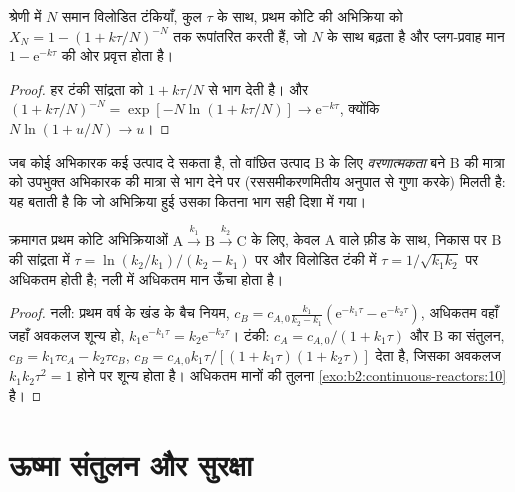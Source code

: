 \begin{proposition}[श्रेणी में टंकियाँ]\label{prop:b2:continuous-reactors:cascade}
श्रेणी में $N$ समान विलोडित टंकियाँ, कुल  $\tau$ के साथ,
प्रथम कोटि की अभिक्रिया को $X_N = 1 - (1 + k\tau/N)^{-N}$ तक रूपांतरित करती हैं, जो
$N$ के साथ बढ़ता है और प्लग-प्रवाह मान $1 - \mathrm e^{-k\tau}$ की ओर प्रवृत्त होता है।
\end{proposition}

\begin{proof}
हर टंकी सांद्रता को $1 + k\tau/N$ से भाग देती है। और $(1 +
k\tau/N)^{-N} = \exp[-N\ln(1 + k\tau/N)] \to \mathrm e^{-k\tau}$, क्योंकि
$N\ln(1 + u/N) \to u$।
\end{proof}

\begin{definition}\label{def:b2:continuous-reactors:selectivity}
जब कोई अभिकारक कई उत्पाद दे सकता है, तो वांछित उत्पाद B के लिए
\emph{वरणात्मकता} बने B की मात्रा को उपभुक्त
अभिकारक की मात्रा से भाग देने पर (रससमीकरणमितीय अनुपात से गुणा करके) मिलती है: यह बताती है कि
जो अभिक्रिया हुई उसका कितना भाग सही दिशा में गया।
\end{definition}

\begin{proposition}[टंकी और नली में एक मध्यवर्ती]\label{prop:b2:continuous-reactors:consecutive}
क्रमागत प्रथम कोटि अभिक्रियाओं $\mathrm A \xrightarrow{k_1} \mathrm B
\xrightarrow{k_2} \mathrm C$ के लिए, केवल A वाले फ़ीड के साथ, निकास पर B की
सांद्रता  में $\tau = \ln(k_2/k_1)/(k_2 - k_1)$ पर
और विलोडित टंकी में $\tau = 1/\sqrt{k_1k_2}$ पर अधिकतम होती है;
नली में अधिकतम मान ऊँचा होता है।
\end{proposition}

\begin{proof}
नली: प्रथम वर्ष के खंड के बैच नियम, $c_B = c_{A,0}\frac{k_1}{k_2 - k_1}
(\mathrm e^{-k_1\tau} - \mathrm e^{-k_2\tau})$, अधिकतम वहाँ जहाँ अवकलज
शून्य हो, $k_1\mathrm e^{-k_1\tau} = k_2\mathrm e^{-k_2\tau}$। टंकी: $c_A =
c_{A,0}/(1 + k_1\tau)$ और B का संतुलन, $c_B = k_1\tau c_A - k_2\tau c_B$,
$c_B = c_{A,0}k_1\tau/[(1 + k_1\tau)(1 + k_2\tau)]$ देता है, जिसका अवकलज
$k_1k_2\tau^2 = 1$ होने पर शून्य होता है। अधिकतम मानों की तुलना
\cref{exo:b2:continuous-reactors:10} है।
\end{proof}

\section{ऊष्मा संतुलन और सुरक्षा}

